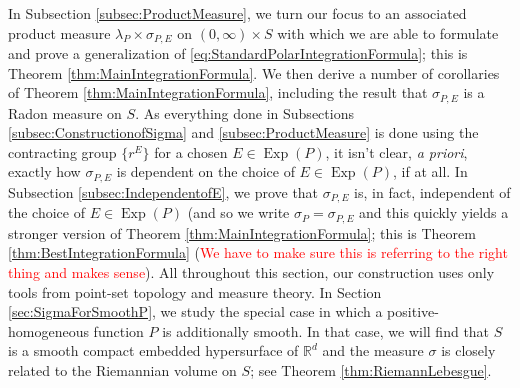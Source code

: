 \documentclass[11pt]{article}
\theoremstyle{remark}
\newcommand\Exp{\operatorname{Exp}}
\begin{document}
In Subsection \ref{subsec:ProductMeasure}, we turn our focus to an associated product measure $\lambda_P\times\sigma_{P,E}$ on $(0,\infty)\times S$ with which we are able to formulate and prove a generalization of \eqref{eq:StandardPolarIntegrationFormula}; this is Theorem \ref{thm:MainIntegrationFormula}. We then derive a number of corollaries of Theorem \ref{thm:MainIntegrationFormula}, including the result that $\sigma_{P,E}$ is a Radon measure on $S$. As everything done in Subsections \ref{subsec:ConstructionofSigma} and \ref{subsec:ProductMeasure} is done using the contracting group $\{r^E\}$ for a chosen $E\in\Exp(P)$, it isn't clear, \textit{a priori}, exactly how $\sigma_{P,E}$ is dependent on the choice of $E\in\Exp(P)$, if at all. In Subsection \ref{subsec:IndependentofE}, we prove that $\sigma_{P,E}$ is, in fact, independent of the choice of $E\in \Exp(P)$ (and so we write $\sigma_P=\sigma_{P,E}$ and this quickly yields a stronger version of Theorem \ref{thm:MainIntegrationFormula}; this is Theorem \ref{thm:BestIntegrationFormula} (\textcolor{red}{We have to make sure this is referring to the right thing and makes sense}). All throughout this section, our construction uses only tools from point-set topology and measure theory.  In Section \ref{sec:SigmaForSmoothP}, we study the special case in which a positive-homogeneous function $P$ is additionally smooth. In that case, we will find that $S$ is a smooth compact embedded hypersurface of $\mathbb{R}^d$ and the measure $\sigma$ is closely related to the Riemannian volume on $S$; see Theorem \ref{thm:RiemannLebesgue}.\\
\end{document}
